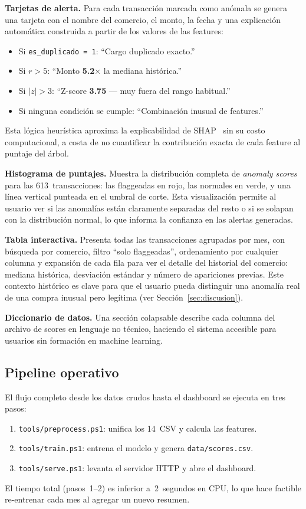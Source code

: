 \documentclass[conference]{IEEEtran}
\begin{document}
\textbf{Tarjetas de alerta.}  Para cada transacci\'on marcada como an\'omala se genera
una tarjeta con el nombre del comercio, el monto, la fecha y una explicaci\'on
autom\'atica construida a partir de los valores de las features:
\begin{itemize}
  \item Si \texttt{es\_duplicado = 1}: ``Cargo duplicado exacto.''
  \item Si $r > 5$: ``Monto \textbf{5.2$\times$} la mediana hist\'orica.''
  \item Si $|z| > 3$: ``Z-score \textbf{3.75} --- muy fuera del rango habitual.''
  \item Si ninguna condici\'on se cumple: ``Combinaci\'on inusual de features.''
\end{itemize}
Esta l\'ogica heur\'istica aproxima la explicabilidad de SHAP~\cite{lodhi2026explainable, wang2026dashboard}
sin su costo computacional, a costa de no cuantificar la contribuci\'on exacta de
cada feature al puntaje del \'arbol.

\textbf{Histograma de puntajes.}  Muestra la distribuci\'on completa de
\emph{anomaly scores} para las 613~transacciones: las flaggeadas en rojo, las
normales en verde, y una l\'inea vertical punteada en el umbral de corte. Esta
visualizaci\'on permite al usuario ver si las anomal\'ias est\'an claramente separadas
del resto o si se solapan con la distribuci\'on normal, lo que informa la confianza
en las alertas generadas.

\textbf{Tabla interactiva.}  Presenta todas las transacciones agrupadas por mes,
con b\'usqueda por comercio, filtro ``solo flaggeadas'', ordenamiento por cualquier
columna y expansi\'on de cada fila para ver el detalle del historial del comercio:
mediana hist\'orica, desviaci\'on est\'andar y n\'umero de apariciones previas.
Este contexto hist\'orico es clave para que el usuario pueda distinguir una anomal\'ia
real de una compra inusual pero leg\'itima (ver Secci\'on~\ref{sec:discusion}).

\textbf{Diccionario de datos.}  Una secci\'on colapsable describe cada columna
del archivo de scores en lenguaje no t\'ecnico, haciendo el sistema accesible para
usuarios sin formaci\'on en machine learning.

\subsection{Pipeline operativo}

El flujo completo desde los datos crudos hasta el dashboard se ejecuta en tres
pasos:
\begin{enumerate}
  \item \texttt{tools/preprocess.ps1}: unifica los 14~CSV y calcula las features.
  \item \texttt{tools/train.ps1}: entrena el modelo y genera \texttt{data/scores.csv}.
  \item \texttt{tools/serve.ps1}: levanta el servidor HTTP y abre el dashboard.
\end{enumerate}
El tiempo total (pasos~1--2) es inferior a~2~segundos en CPU, lo que hace factible
re-entrenar cada mes al agregar un nuevo resumen.
\end{document}
